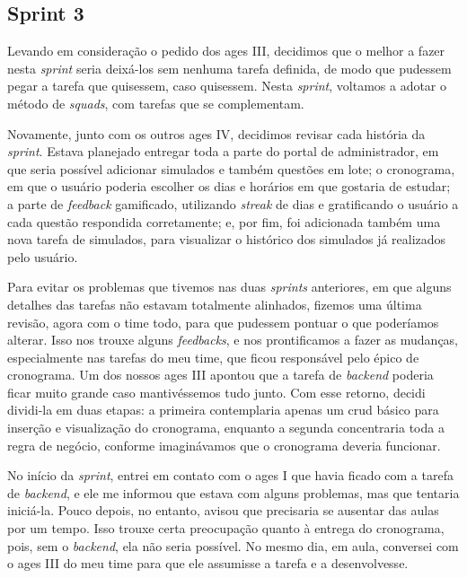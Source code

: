\subsection{Sprint 3}

Levando em consideração o pedido dos \ac{ages} III, decidimos que o melhor a fazer nesta \textit{sprint} seria deixá-los sem nenhuma tarefa definida, de modo que pudessem pegar a tarefa que quisessem, caso quisessem. Nesta \textit{sprint}, voltamos a adotar o método de \textit{squads}, com tarefas que se complementam.

Novamente, junto com os outros \ac{ages} IV, decidimos revisar cada história da \textit{sprint}. Estava planejado entregar toda a parte do portal de administrador, em que seria possível adicionar simulados e também questões em lote; o cronograma, em que o usuário poderia escolher os dias e horários em que gostaria de estudar; a parte de \textit{feedback} gamificado, utilizando \textit{streak} de dias e gratificando o usuário a cada questão respondida corretamente; e, por fim, foi adicionada também uma nova tarefa de simulados, para visualizar o histórico dos simulados já realizados pelo usuário.

Para evitar os problemas que tivemos nas duas \textit{sprints} anteriores, em que alguns detalhes das tarefas não estavam totalmente alinhados, fizemos uma última revisão, agora com o time todo, para que pudessem pontuar o que poderíamos alterar. Isso nos trouxe alguns \textit{feedbacks}, e nos prontificamos a fazer as mudanças, especialmente nas tarefas do meu time, que ficou responsável pelo épico de cronograma. Um dos nossos \ac{ages} III apontou que a tarefa de \textit{backend} poderia ficar muito grande caso mantivéssemos tudo junto. Com esse retorno, decidi dividi-la em duas etapas: a primeira contemplaria apenas um \ac{crud} básico para inserção e visualização do cronograma, enquanto a segunda concentraria toda a regra de negócio, conforme imaginávamos que o cronograma deveria funcionar.

No início da \textit{sprint}, entrei em contato com o \ac{ages} I que havia ficado com a tarefa de \textit{backend}, e ele me informou que estava com alguns problemas, mas que tentaria iniciá-la. Pouco depois, no entanto, avisou que precisaria se ausentar das aulas por um tempo. Isso trouxe certa preocupação quanto à entrega do cronograma, pois, sem o \textit{backend}, ela não seria possível. No mesmo dia, em aula, conversei com o \ac{ages} III do meu time para que ele assumisse a tarefa e a desenvolvesse.

